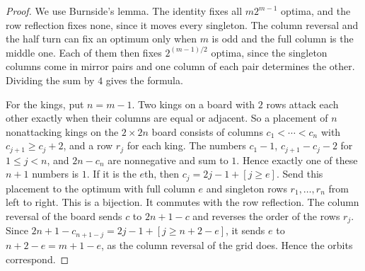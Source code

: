 \begin{proof}
We use Burnside's lemma. The identity fixes all $m2^{m-1}$ optima, and the row
reflection fixes none, since it moves every singleton. The column reversal and
the half turn can fix an optimum only when $m$ is odd and the full column is
the middle one. Each of them then fixes $2^{(m-1)/2}$ optima, since the
singleton columns come in mirror pairs and one column of each pair determines
the other. Dividing the sum by $4$ gives the formula.

For the kings, put $n=m-1$. Two kings on a board with $2$ rows attack each other
exactly when their columns are equal or adjacent. So a placement of $n$
nonattacking kings on the $2\times2n$ board consists of columns
$c_1<\cdots<c_n$ with $c_{j+1}\ge c_j+2$, and a row $r_j$ for each king. The
numbers $c_1-1$, $c_{j+1}-c_j-2$ for $1\le j<n$, and $2n-c_n$ are nonnegative and
sum to $1$. Hence exactly one of these $n+1$ numbers is $1$. If it is the $e$th,
then $c_j=2j-1+[j\ge e]$. Send this placement to the optimum with full column
$e$ and singleton rows $r_1,\ldots,r_n$ from left to right. This is a bijection.
It commutes with the row reflection. The column reversal of the board sends
$c$ to $2n+1-c$ and reverses the order of the rows $r_j$. Since
$2n+1-c_{n+1-j}=2j-1+[j\ge n+2-e]$, it sends $e$ to $n+2-e=m+1-e$, as the column
reversal of the grid does. Hence the orbits correspond.
\end{proof}
